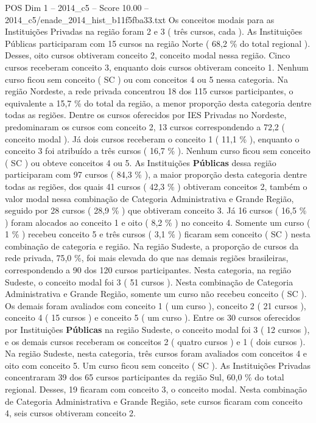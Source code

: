 \begin{textsample}{POS Dim 1 – 2014\_c5 – Score 10.00 – 2014\_c5/enade\_2014\_hist\_b11f5fba33.txt}
Os conceitos modais para as Instituições Privadas na região foram 2 e 3 ( três cursos, cada ).
As Instituições Públicas participaram com 15 cursos na região Norte ( 68,2 \% do total regional ).
Desses, oito cursos obtiveram conceito 2, conceito modal nessa região.
Cinco cursos receberam conceito 3, enquanto dois cursos obtiveram conceito 1.
Nenhum curso ficou sem conceito ( SC ) ou com conceitos 4 ou 5 nessa categoria.
Na região Nordeste, a rede privada concentrou 18 dos 115 cursos participantes, o equivalente a 15,7 \% do total da região, a menor proporção desta categoria dentre todas as regiões.
Dentre os cursos oferecidos por IES Privadas no Nordeste, predominaram os cursos com conceito 2, 13 cursos correspondendo a 72,2 ( conceito modal ).
Já dois cursos receberam o conceito 1 ( 11,1 \% ), enquanto o conceito 3 foi atribuído a três cursos ( 16,7 \% ).
Nenhum curso ficou sem conceito ( SC ) ou obteve conceitos 4 ou 5.
As Instituições \textbf{Públicas} dessa região participaram com 97 cursos ( 84,3 \% ), a maior proporção desta categoria dentre todas as regiões, dos quais 41 cursos ( 42,3 \% ) obtiveram conceitos 2, também o valor modal nessa combinação de Categoria Administrativa e Grande Região, seguido por 28 cursos ( 28,9 \% ) que obtiveram conceito 3.
Já 16 cursos ( 16,5 \% ) foram alocados ao conceito 1 e oito ( 8,2 \% ) no conceito 4.
Somente um curso ( 1 \% ) recebeu conceito 5 e três cursos ( 3,1 \% ) ficaram sem conceito ( SC ) nesta combinação de categoria e região.
Na região Sudeste, a proporção de cursos da rede privada, 75,0 \%, foi mais elevada do que nas demais regiões brasileiras, correspondendo a 90 dos 120 cursos participantes.
Nesta categoria, na região Sudeste, o conceito modal foi 3 ( 51 cursos ).
Nesta combinação de Categoria Administrativa e Grande Região, somente um curso não recebeu conceito ( SC ).
Os demais foram avaliados com conceito 1 ( um curso ), conceito 2 ( 21 cursos ), conceito 4 ( 15 cursos ) e conceito 5 ( um curso ).
Entre os 30 cursos oferecidos por Instituições \textbf{Públicas} na região Sudeste, o conceito modal foi 3 ( 12 cursos ), e os demais cursos receberam os conceitos 2 ( quatro cursos ) e 1 ( dois cursos ).
Na região Sudeste, nesta categoria, três cursos foram avaliados com conceitos 4 e oito com conceito 5.
Um curso ficou sem conceito ( SC ).
As Instituições Privadas concentraram 39 dos 65 cursos participantes da região Sul, 60,0 \% do total regional.
Desses, 19 ficaram com conceito 3, o conceito modal.
Nesta combinação de Categoria Administrativa e Grande Região, sete cursos ficaram com conceito 4, seis cursos obtiveram conceito 2.

\end{textsample}
